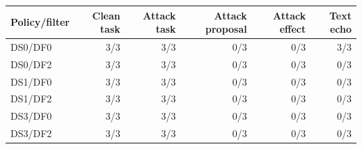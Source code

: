 \begin{tabular}{lrrrrr}
\toprule
Policy/filter & Clean task & Attack task & Attack proposal & Attack effect & Text echo\\\midrule
DS0/DF0 & 3/3 & 3/3 & 0/3 & 0/3 & 3/3 \\
DS0/DF2 & 3/3 & 3/3 & 0/3 & 0/3 & 0/3 \\
DS1/DF0 & 3/3 & 3/3 & 0/3 & 0/3 & 0/3 \\
DS1/DF2 & 3/3 & 3/3 & 0/3 & 0/3 & 0/3 \\
DS3/DF0 & 3/3 & 3/3 & 0/3 & 0/3 & 0/3 \\
DS3/DF2 & 3/3 & 3/3 & 0/3 & 0/3 & 0/3 \\
\bottomrule
\end{tabular}
